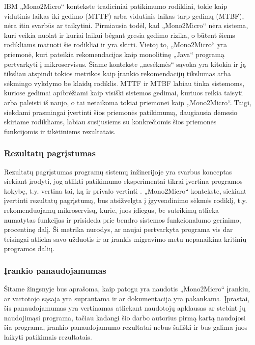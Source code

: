 \documentclass{VUMIFPSbakalaurinis}
\begin{document}
IBM „Mono2Micro“ kontekste tradiciniai patikimumo rodikliai, tokie kaip vidutinis laikas iki gedimo (MTTF) arba vidutinis laikas tarp gedimų (MTBF), nėra itin svarbūs ar taikytini. Pirmiausia todėl, kad „Mono2Micro“ nėra sistema, kuri veikia nuolat ir kuriai laikui bėgant gresia gedimo rizika, o būtent šiems rodikliams matuoti šie rodikliai ir yra skirti. Vietoj to, „Mono2Micro“ yra priemonė, kuri pateikia rekomendacijas kaip monolitinę „Java“ programą pertvarkyti į mikroservisus. Šiame kontekste „nesėkmės“ sąvoka yra kitokia ir ją tiksliau atspindi tokios metrikos kaip įrankio rekomendacijų tikslumas arba sėkmingo vykdymo be klaidų rodiklis. MTTF ir MTBF labiau tinka sistemoms, kuriose gedimai apibrėžiami kaip visiški sistemos gedimai, kuriuos reikia taisyti arba paleisti iš naujo, o tai netaikoma tokiai priemonei kaip „Mono2Micro“. Taigi, siekdami prasmingai įvertinti šios priemonės patikimumą, daugiausia dėmesio skiriame rodikliams, labiau susijusiems su konkrečiomis šios priemonės funkcijomis ir tikėtiniems rezultatais.
\subsubsection{Rezultatų pagrįstumas}
Rezultatų pagrįstumas programų sistemų inžinerijoje yra svarbus konceptas siekiant įrodyti, jog atlikti patikimumo eksperimentai tikrai įvertina programos kokybę, t.y. vertina tai, ką ir privalo vertinti \cite{LMPV}. „Mono2Micro“ kontekste, siekiant įvertinti rezultatų pagrįstumą, bus atsižvelgta į įgyvendinimo sėkmės rodiklį, t.y. rekomenduojamų mikroservisų, kurie, juos įdiegus, be sutrikimų atlieka numatytas funkcijas ir prisideda prie bendro sistemos funkcionalumo gerinimo, procentinę dalį. Ši metrika nurodys, ar naujai pertvarkyta programa vis dar teisingai atlieka savo užduotis ir ar įrankis migravimo metu nepanaikina kritinių programos dalių.

\subsubsection{Įrankio panaudojamumas}
Šitame žingsnyje bus aprašoma, kaip patogu yra naudotis „Mono2Micro“ įrankiu, ar vartotojo sąsaja yra suprantama ir ar dokumentacija yra pakankama. Įprastai, šis panaudojamumas yra vertinamas atliekant naudotojų apklausas ar stebint jų naudojimąsi programa, tačiau kadangi šio darbo autorius pirmą kartą naudojosi šia programa, įrankio panaudojamumo rezultatai nebus šališki ir bus galima juos laikyti patikimais rezultatais.
\end{document}
